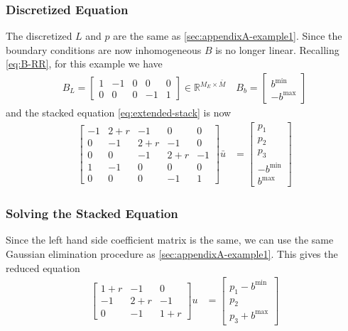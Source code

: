 \documentclass[11pt]{article}
\newcommand{\R}{\ensuremath{\mathbb{R}}}
\begin{document}
\subsubsection{Discretized Equation}
The discretized $L$ and $p$ are the same as \ref{sec:appendixA-example1}. Since the boundary conditions are now inhomogeneous $B$ is no longer linear. Recalling \cref{eq:B-RR}, for this example we have
\begin{align}
	B_L = \begin{bmatrix}
		1 & -1 & 0 & 0 & 0\\
		0 & 0 & 0 & -1 & 1
	\end{bmatrix}\in\R^{M_E \times \bar{M}}\quad
	B_b = \begin{bmatrix}b^{\min}\\-b^{\max}\end{bmatrix}
\end{align}
and the stacked equation \cref{eq:extended-stack} is now
\begin{align}
	\begin{bmatrix}
		-1 & 2 + r & -1 & 0 & 0\\
		0 & -1 & 2+r & -1 & 0\\
		0 & 0 & -1 & 2+r & -1\\
		1 & -1 & 0 & 0 & 0\\
		0 & 0 & 0 & -1 & 1
	\end{bmatrix} \bar{u} &= \begin{bmatrix} p_1 \\ p_2 \\ p_3 \\ -b^{\min} \\ b^{\max}\end{bmatrix}
\end{align}

\subsubsection{Solving the Stacked Equation}
Since the left hand side coefficient matrix is the same, we can use the same Gaussian elimination procedure as \ref{sec:appendixA-example1}. This gives the reduced equation
\begin{align}
	\begin{bmatrix}
		1+r & -1 & 0\\
		-1 & 2+r & -1\\
		0 & -1 & 1+r
	\end{bmatrix}u
	&= \begin{bmatrix}
		p_1 - b^{\min}\\ p_2 \\ p_3 + b^{\max}
	\end{bmatrix}\label{eq:reduced-example-3}
\end{align}
\end{document}
